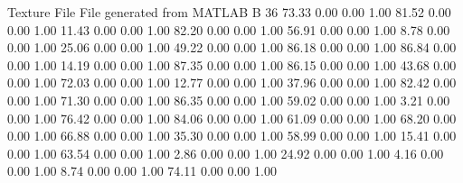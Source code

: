 Texture File
File generated from MATLAB
B 36
   73.33   0.00   0.00   1.00
   81.52   0.00   0.00   1.00
   11.43   0.00   0.00   1.00
   82.20   0.00   0.00   1.00
   56.91   0.00   0.00   1.00
    8.78   0.00   0.00   1.00
   25.06   0.00   0.00   1.00
   49.22   0.00   0.00   1.00
   86.18   0.00   0.00   1.00
   86.84   0.00   0.00   1.00
   14.19   0.00   0.00   1.00
   87.35   0.00   0.00   1.00
   86.15   0.00   0.00   1.00
   43.68   0.00   0.00   1.00
   72.03   0.00   0.00   1.00
   12.77   0.00   0.00   1.00
   37.96   0.00   0.00   1.00
   82.42   0.00   0.00   1.00
   71.30   0.00   0.00   1.00
   86.35   0.00   0.00   1.00
   59.02   0.00   0.00   1.00
    3.21   0.00   0.00   1.00
   76.42   0.00   0.00   1.00
   84.06   0.00   0.00   1.00
   61.09   0.00   0.00   1.00
   68.20   0.00   0.00   1.00
   66.88   0.00   0.00   1.00
   35.30   0.00   0.00   1.00
   58.99   0.00   0.00   1.00
   15.41   0.00   0.00   1.00
   63.54   0.00   0.00   1.00
    2.86   0.00   0.00   1.00
   24.92   0.00   0.00   1.00
    4.16   0.00   0.00   1.00
    8.74   0.00   0.00   1.00
   74.11   0.00   0.00   1.00

